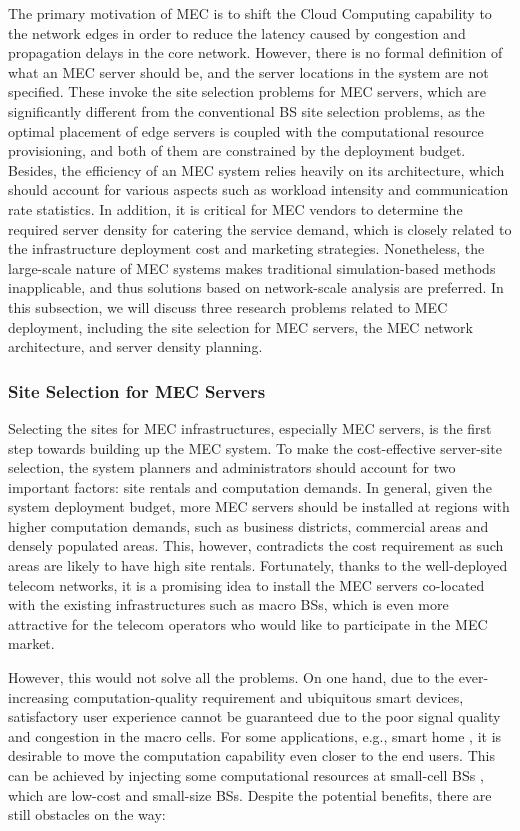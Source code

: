 \documentclass[journal]{IEEEtran}
\begin{document}
{The primary motivation of MEC is to shift the Cloud Computing capability to the network edges in order to reduce the latency caused by congestion and propagation delays in the core network. However, there is no formal definition of what an MEC server should be, and the server locations in the system are not specified. These invoke the site selection problems for MEC servers, which are significantly different from the conventional BS site selection problems, as the optimal placement of edge servers is coupled with the computational resource provisioning, and both of them are constrained by the deployment budget. Besides, the efficiency of an MEC system relies heavily on its architecture, which should account for various aspects such as workload intensity and communication rate statistics. In addition, it is critical for MEC vendors to determine the required server density for catering the service demand, which is closely related to the infrastructure deployment cost and marketing strategies. Nonetheless, the large-scale nature of MEC systems makes traditional simulation-based methods inapplicable, and thus solutions based on network-scale analysis are preferred. In this subsection, we will discuss three research problems related to MEC deployment, including the site selection for MEC servers, the MEC network architecture, and server density planning.

\subsubsection{\textbf{Site Selection for MEC Servers}}

Selecting the sites for MEC infrastructures, especially MEC servers, is the first step towards building up the MEC system. To make the cost-effective server-site selection, the system planners and administrators should account for two important factors: site rentals and computation demands. In general, given the system deployment budget, more MEC servers should be installed at regions with higher computation demands, such as business districts, commercial areas and densely populated areas. This, however, contradicts the cost requirement as such areas are likely to have high site rentals. Fortunately, thanks to the well-deployed telecom networks, it is a promising idea to install the MEC servers co-located with the existing infrastructures such as macro BSs, which is even more attractive for the telecom operators who would like to participate in the MEC market.

However, this would not solve all the problems. On one hand, due to the ever-increasing computation-quality requirement and ubiquitous smart devices, satisfactory user experience cannot be guaranteed due to the poor signal quality and congestion in the macro cells. For some applications, e.g., smart home \cite{CVallati1610}, it is desirable to move the computation capability even closer to the end users. This can be achieved by injecting some computational resources at small-cell BSs \cite{Andrews1203,Dhillon1203}, which are low-cost and small-size BSs. Despite the potential benefits, there are still obstacles on the way:


}
\end{document}
